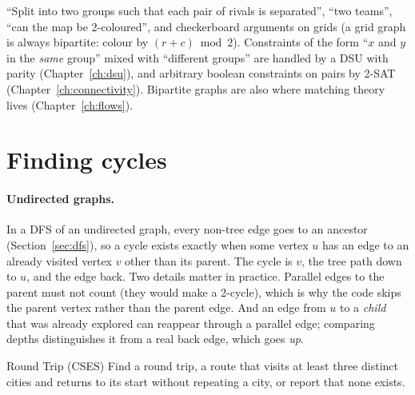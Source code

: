 
\begin{recognize}
``Split into two groups such that each pair of rivals is separated'', ``two teams'', ``can the map be 2-coloured'', and
checkerboard arguments on grids (a grid graph is always bipartite: colour by $(r + c) \bmod 2$). Constraints of the form
``$x$ and $y$ in the \emph{same} group'' mixed with ``different groups'' are handled by a DSU with parity
(Chapter~\ref{ch:dsu}), and arbitrary boolean constraints on pairs by 2-SAT (Chapter~\ref{ch:connectivity}). Bipartite graphs
are also where matching theory lives (Chapter~\ref{ch:flows}).
\end{recognize}

\section[Finding cycles]{Finding cycles \hfill \gold}\label{sec:cycles}

\paragraph{Undirected graphs.} In a DFS of an undirected graph, every non-tree edge goes to an ancestor
(Section~\ref{sec:dfs}), so a cycle exists exactly when some vertex $u$ has an edge to an already visited vertex $v$ other
than its parent. The cycle is $v$, the tree path down to $u$, and the edge back. Two details matter in practice. Parallel
edges to the parent must not count (they would make a 2-cycle), which is why the code skips the parent vertex rather than
the parent edge. And an edge from $u$ to a \emph{child} that was already explored can reappear through a parallel edge;
comparing depths distinguishes it from a real back edge, which goes \emph{up}.

\begin{problem}{Round Trip (CSES)}
Find a round trip, a route that visits at least three distinct cities and returns to its start without repeating a city, or
report that none exists.
\end{problem}

